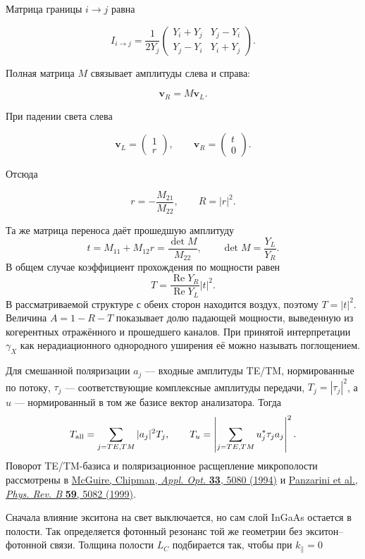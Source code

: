 \documentclass[12pt,a4paper]{article}
\begin{document}
Матрица границы $i\rightarrow j$ равна

\[
I_{i\rightarrow j}
=
\frac{1}{2Y_j}
\begin{pmatrix}
Y_i+Y_j & Y_j-Y_i\\
Y_j-Y_i & Y_i+Y_j
\end{pmatrix}.
\]

Полная матрица $M$ связывает амплитуды слева и справа:

\[
\mathbf v_R=M\mathbf v_L.
\]

При падении света слева

\[
\mathbf v_L=
\begin{pmatrix}
1\\r
\end{pmatrix},
\qquad
\mathbf v_R=
\begin{pmatrix}
t\\0
\end{pmatrix}.
\]

Отсюда

\[
r=-\frac{M_{21}}{M_{22}},
\qquad
R=|r|^2.
\]

Та же матрица переноса даёт прошедшую амплитуду
\[
t=M_{11}+M_{12}r=\frac{\det M}{M_{22}},
\qquad \det M=\frac{Y_L}{Y_R}.
\]
В общем случае коэффициент прохождения по мощности равен
\[
T=\frac{\operatorname{Re}Y_R}{\operatorname{Re}Y_L}|t|^2.
\]
В рассматриваемой структуре с обеих сторон находится воздух, поэтому $T=|t|^2$.
Величина $A=1-R-T$ показывает долю падающей мощности, выведенную из
когерентных отражённого и прошедшего каналов. При принятой интерпретации
$\gamma_X$ как нерадиационного однородного уширения её можно называть
поглощением.

Для смешанной поляризации $a_j$ --- входные амплитуды TE/TM,
нормированные по потоку, $\tau_j$ --- соответствующие комплексные
амплитуды передачи, $T_j=|\tau_j|^2$, а $u$ --- нормированный в том же
базисе вектор анализатора. Тогда
\[
T_{\rm all}=\sum_{j=TE,TM}|a_j|^2T_j,\qquad
T_u=\left|\sum_{j=TE,TM}u_j^*\tau_j a_j\right|^2.
\]
Поворот TE/TM-базиса и поляризационное расщепление микрополости
рассмотрены в \href{https://doi.org/10.1364/AO.33.005080}{McGuire, Chipman,
\textit{Appl. Opt.} \textbf{33}, 5080 (1994)} и
\href{https://doi.org/10.1103/PhysRevB.59.5082}{Panzarini et al.,
\textit{Phys. Rev. B} \textbf{59}, 5082 (1999)}.

Сначала влияние экситона на свет выключается, но сам слой InGaAs остается в полости. Так определяется фотонный резонанс той же геометрии без экситон--фотонной связи. Толщина полости $L_C$ подбирается так, чтобы при $k_\parallel=0$
\end{document}
